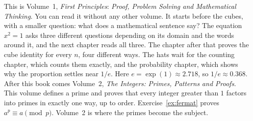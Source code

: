 This is Volume~1, \emph{First Principles}: \emph{Proof, Problem Solving and Mathematical Thinking}. You can read it without any other volume. It starts before the cubes, with a smaller question: what does a mathematical sentence say? The equation $x^2=1$ asks three different questions depending on its domain and the words around it, and the next chapter reads all three. The chapter after that proves the cube identity for every $n$, four different ways. The hats wait for the counting chapter, which counts them exactly, and the probability chapter, which shows why the proportion settles near $1/e$. Here $e=\exp(1)\approx 2.718$, so $1/e\approx 0.368$. After this book comes Volume~2, \emph{The Integers: Primes, Patterns and Proofs}. This volume defines a prime and proves that every integer greater than $1$ factors into primes in exactly one way, up to order. Exercise~\ref{ex:fermat} proves $a^p\equiv a\pmod p$. Volume~2 is where the primes become the subject.
